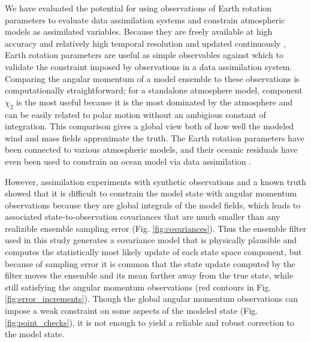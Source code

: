 We have evaluated the potential for using observations of Earth rotation parameters to evaluate data assimilation systems and constrain atmospheric models as assimilated variables.  
%
Because they are freely available at high accuracy and relatively high temporal resolution and updated continuously \citep{iers}, 
Earth rotation parameters are useful as simple observables against which to validate the constraint imposed by observations in a data assimilation system.  
Comparing the angular momentum of a model ensemble to these observations is computationally straightforward;
for a standalone atmosphere model, component $\chi_2$ is the most useful because it is the most dominated by the atmosphere and can be easily related to polar motion without an ambigious constant of integration. 
This comparison gives a global view both of how well the modeled wind and mass fields approximate the truth.
The Earth rotation parameters have been connected to various atmospheric models, and their oceanic residuals have even been used to constrain an ocean model via data assimilation \citep{Saynisch2010,Saynisch2011,Saynisch2012}. 

However, assimilation experiments with synthetic observations and a known truth showed that it is difficult to constrain the model state with angular momentum observations because they are global integrals of the model fields, which leads to 
associated state-to-observation covariances that are much smaller than any realizible ensemble sampling error (Fig. \ref{fig:covariances}). 
Thus the ensemble filter used in this study generates a covariance model that is physically plausible and computes the statistically most likely update of each state space component, but because of sampling error it is common that 
the state update computed by the filter moves the ensemble and its mean farther away from the true state, while still satisfying the angular momentum observations (red contours in Fig. \ref{fig:error_increments}). 
Though the global angular momentum observations can impose a weak constraint on some aspects of the modeled state (Fig. \ref{fig:point_checks}), it is not enough to yield a reliable and robust correction to the model state. 

